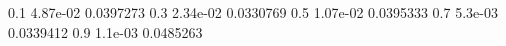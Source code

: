 0.1 4.87e-02 0.0397273
0.3 2.34e-02 0.0330769
0.5 1.07e-02 0.0395333
0.7 5.3e-03 0.0339412
0.9 1.1e-03 0.0485263